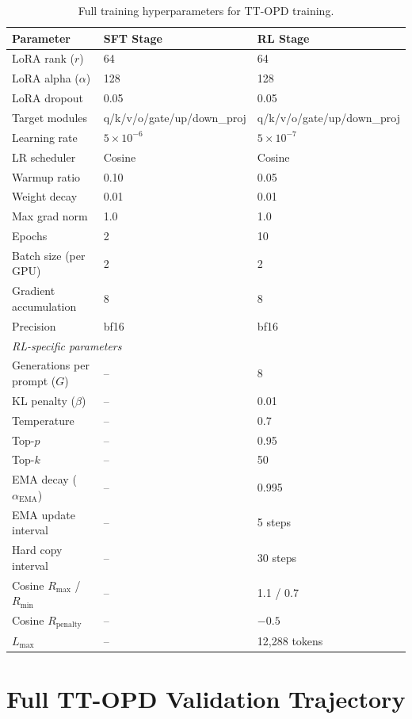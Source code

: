 \documentclass{article}
\begin{document}
\begin{table}[h]
\centering
\caption{Full training hyperparameters for TT-OPD training.}
\label{tab:hyperparams}
\begin{tabular}{lll}
\toprule
\textbf{Parameter} & \textbf{SFT Stage} & \textbf{RL Stage} \\
\midrule
LoRA rank ($r$) & 64 & 64 \\
LoRA alpha ($\alpha$) & 128 & 128 \\
LoRA dropout & 0.05 & 0.05 \\
Target modules & q/k/v/o/gate/up/down\_proj & q/k/v/o/gate/up/down\_proj \\
Learning rate & $5 \times 10^{-6}$ & $5 \times 10^{-7}$ \\
LR scheduler & Cosine & Cosine \\
Warmup ratio & 0.10 & 0.05 \\
Weight decay & 0.01 & 0.01 \\
Max grad norm & 1.0 & 1.0 \\
Epochs & 2 & 10 \\
Batch size (per GPU) & 2 & 2 \\
Gradient accumulation & 8 & 8 \\
Precision & bf16 & bf16 \\
\midrule
\multicolumn{3}{l}{\emph{RL-specific parameters}} \\
Generations per prompt ($G$) & -- & 8 \\
KL penalty ($\beta$) & -- & 0.01 \\
Temperature & -- & 0.7 \\
Top-$p$ & -- & 0.95 \\
Top-$k$ & -- & 50 \\
EMA decay ($\alpha_{\text{EMA}}$) & -- & 0.995 \\
EMA update interval & -- & 5 steps \\
Hard copy interval & -- & 30 steps \\
Cosine $R_{\text{max}}$ / $R_{\text{min}}$ & -- & 1.1 / 0.7 \\
Cosine $R_{\text{penalty}}$ & -- & $-0.5$ \\
$L_{\text{max}}$ & -- & 12,288 tokens \\
\bottomrule
\end{tabular}
\end{table}


\section{Full TT-OPD Validation Trajectory}
\label{app:trajectory}
\end{document}
